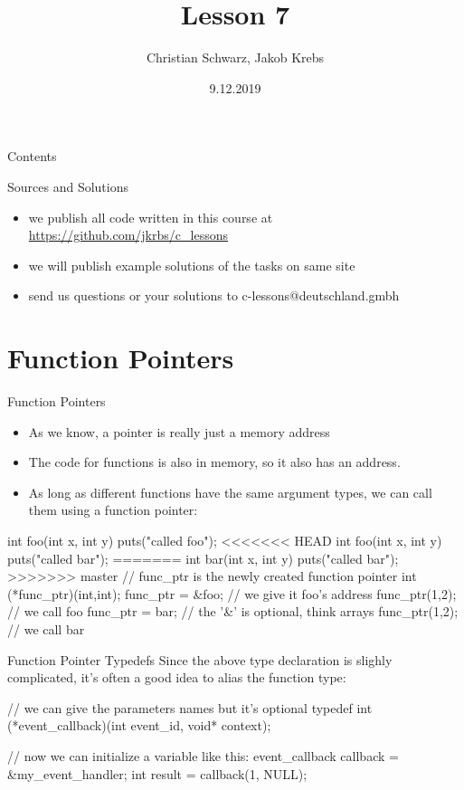 \documentclass[10pt,graphics,aspectratio=169,table]{beamer}
\title{Lesson 7}
\author{Christian Schwarz, Jakob Krebs}
\date{9.12.2019}
\begin{document}
\maketitle

\begin{frame}{Contents}
    \tableofcontents
\end{frame}

\begin{frame}{Sources and Solutions}
    \begin{itemize}
        \item we publish all code written in this course at \url{https://github.com/jkrbs/c_lessons}
        \item we will publish example solutions of the tasks on same site
        \item send us questions or your solutions to c-lessons@deutschland.gmbh
    \end{itemize}
\end{frame}


\section{Function Pointers}
\begin{frame}[fragile]{Function Pointers}
    \begin{itemize}
        \item As we know, a pointer is really just a memory address
        \item The code for functions is also in memory, so it also has an address.
        \item As long as different functions have the same argument types, we
        can call them using a function pointer:
    \end{itemize}

    \begin{codeblock}
int foo(int x, int y){ puts("called foo"); }
<<<<<<< HEAD
int foo(int x, int y){ puts("called bar"); }
=======
int bar(int x, int y){ puts("called bar"); }
>>>>>>> master
// func_ptr is the newly created function pointer 
int (*func_ptr)(int,int);
func_ptr = &foo; // we give it foo's address
func_ptr(1,2); // we call foo
func_ptr = bar; // the '&' is optional, think arrays
func_ptr(1,2); // we call bar
    \end{codeblock}

\end{frame}


\begin{frame}[fragile]{Function Pointer Typedefs}
    Since the above type declaration is slighly complicated,
    it's often a good idea to alias the function type:
    \begin{codeblock}
// we can give the parameters names but it's optional
typedef int (*event_callback)(int event_id, void* context);

// now we can initialize a variable like this:
event_callback callback = &my_event_handler;
int result = callback(1, NULL);
    \end{codeblock}

\end{frame}
\end{document}
